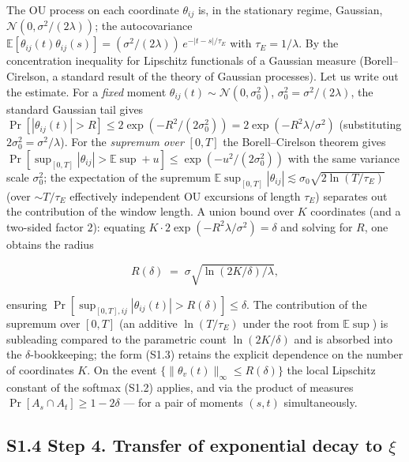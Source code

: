 \documentclass[pdflatex,sn-mathphys-ay]{sn-jnl}
\begin{document}
The OU process on each coordinate \(\theta_{ij}\) is, in the stationary regime, Gaussian, \(\mathcal{N}(0, \sigma^2/(2\lambda))\); the autocovariance \(\mathbb{E}[\theta_{ij}(t)\theta_{ij}(s)] = (\sigma^2/(2\lambda))\, e^{-|t-s|/\tau_E}\) with \(\tau_E = 1/\lambda\). By the concentration inequality for Lipschitz functionals of a Gaussian measure (Borell--Cirelson, a standard result of the theory of Gaussian processes). Let us write out the estimate. For a \emph{fixed} moment \(\theta_{ij}(t) \sim \mathcal{N}(0, \sigma_0^2)\), \(\sigma_0^2 = \sigma^2/(2\lambda)\), the standard Gaussian tail gives \(\Pr[|\theta_{ij}(t)| > R] \le 2\exp(-R^2/(2\sigma_0^2)) = 2\exp(-R^2\lambda/\sigma^2)\) (substituting \(2\sigma_0^2 = \sigma^2/\lambda\)). For the \emph{supremum over} \([0,T]\) the Borell--Cirelson theorem gives \(\Pr[\sup_{[0,T]}|\theta_{ij}| > \mathbb{E}\sup + u] \le \exp(-u^2/(2\sigma_0^2))\) with the same variance scale \(\sigma_0^2\); the expectation of the supremum \(\mathbb{E}\sup_{[0,T]}|\theta_{ij}| \lesssim \sigma_0\sqrt{2\ln(T/\tau_E)}\) (over \(\sim T/\tau_E\) effectively independent OU excursions of length \(\tau_E\)) separates out the contribution of the window length. A union bound over \(K\) coordinates (and a two-sided factor \(2\)): equating \(K \cdot 2\exp(-R^2\lambda/\sigma^2) = \delta\) and solving for \(R\), one obtains the radius



\begin{equation}R(\delta) \;=\; \sigma \sqrt{\ln(2K/\delta)/\lambda}, \tag{S1.3}\end{equation}



ensuring \(\Pr[\sup_{[0,T], ij} |\theta_{ij}(t)| > R(\delta)] \le \delta\). The contribution of the supremum over \([0,T]\) (an additive \(\ln(T/\tau_E)\) under the root from \(\mathbb{E}\sup\)) is subleading compared to the parametric count \(\ln(2K/\delta)\) and is absorbed into the \(\delta\)-bookkeeping; the form (S1.3) retains the explicit dependence on the number of coordinates \(K\). On the event \(\{\|\theta_v(t)\|_\infty \le R(\delta)\}\) the local Lipschitz constant of the softmax (S1.2) applies, and via the product of measures \(\Pr[A_s \cap A_t] \ge 1 - 2\delta\) --- for a pair of moments \((s, t)\) simultaneously.



\subsection*{\texorpdfstring{S1.4 Step 4. Transfer of exponential decay to \(\xi\)}{S1.4 Step 4. Transfer of exponential decay to \textbackslash xi}}\label{s1.4-step-4.-transfer-of-exponential-decay-to-xi}
\end{document}
